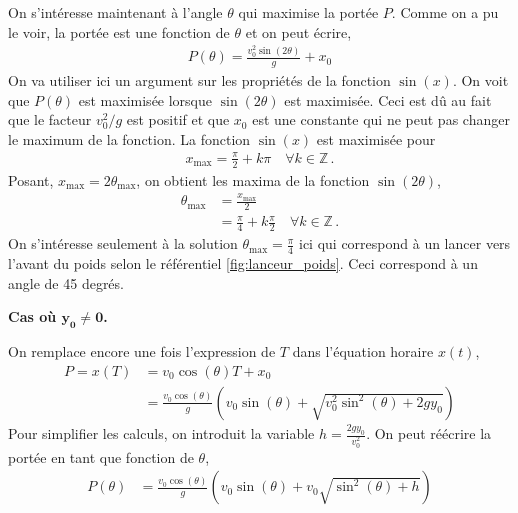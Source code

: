 \documentclass[titlepage]{article}
\theoremstyle{cleanremark}
\begin{document}
On s'intéresse maintenant à l'angle $\theta$ qui maximise la portée $P$. Comme on a pu le voir, la portée est une fonction de $\theta$ et on peut écrire, 
\begin{align}
    P(\theta) = \frac{v_0^2\sin(2\theta)}{g} + x_0
\end{align} 
On va utiliser ici un argument sur les propriétés de la fonction $\sin(x)$. On voit que $P(\theta)$ est maximisée lorsque $\sin(2\theta)$ est maximisée. Ceci est dû au fait que le facteur $v_0^2/g$ est positif et que $x_0$ est une constante qui ne peut pas changer le maximum de la fonction. La fonction $\sin(x)$ est maximisée pour 
\begin{align}
    x_{\max} = \frac{\pi}{2} + k\pi \quad \forall k\in \mathbb{Z}\, .
\end{align}
Posant, $x_{\max} = 2\theta_{\max}$, on obtient les maxima de la fonction $\sin(2\theta)$, 
\begin{align}
    \theta_{\max}&=\frac{x_{\max}}{2} \\
    &= \frac{\pi}{4} + k \frac{\pi}{2} \quad \forall k\in \mathbb{Z}\, .
\end{align} 
On s'intéresse seulement à la solution $\theta_{\max}=\frac{\pi}{4}$ ici qui correspond à un lancer vers l'avant du poids selon 
le référentiel \ref{fig:lanceur_poids}. Ceci correspond à un angle de 45 degrés. 


\noindent \textbf{Cas où $\mathbf{y_0 \neq 0}$.}

\noindent On remplace encore une fois l'expression de $T$ dans l'équation horaire $x(t)$, 
\begin{align}
    P=x(T)&=v_0\cos(\theta) T + x_0
    \\
    &= \frac{v_0\cos(\theta)}{g}\left(v_0\sin(\theta) + \sqrt{v_0^2\sin^2(\theta) + 2g y_0}\right)
\end{align}
Pour simplifier les calculs, on introduit la variable $h=\frac{2g y_0}{v_0^2}$. On peut réécrire la portée en tant que fonction de $\theta$, 
\begin{align}
    P(\theta) &=  \frac{v_0\cos(\theta)}{g}\left(v_0\sin(\theta) + v_0\sqrt{\sin^2(\theta) + h}\right)
\end{align}
\end{document}
